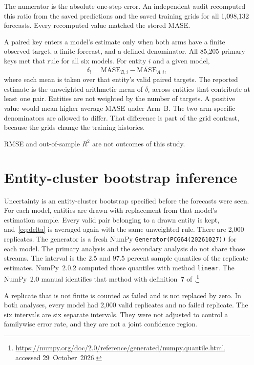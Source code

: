 \documentclass[11pt]{article}
\newcommand{\armB}{Arm~B}
\begin{document}
The numerator is the absolute one-step error. An independent audit recomputed this ratio from the saved predictions and the saved training grids for all 1{,}098{,}132 forecasts. Every recomputed value matched the stored MASE.

A paired key enters a model's estimate only when both arms have a finite observed target, a finite forecast, and a defined denominator. All 85{,}205 primary keys met that rule for all six models. For entity \(i\) and a given model,
\begin{equation}
\delta_i = \overline{\mathrm{MASE}}_{B,i} - \overline{\mathrm{MASE}}_{A,i},
\label{eq:delta}
\end{equation}
where each mean is taken over that entity's valid paired targets. The reported estimate is the unweighted arithmetic mean of \(\delta_i\) across entities that contribute at least one pair. Entities are not weighted by the number of targets. A positive value would mean higher average MASE under \armB{}. The two arm-specific denominators are allowed to differ. That difference is part of the grid contrast, because the grids change the training histories.

RMSE and out-of-sample \(R^{2}\) are not outcomes of this study.

\section{Entity-cluster bootstrap inference}
\label{sec:bootstrap}

Uncertainty is an entity-cluster bootstrap specified before the forecasts were seen. For each model, entities are drawn with replacement from that model's estimation sample. Every valid pair belonging to a drawn entity is kept, and~\eqref{eq:delta} is averaged again with the same unweighted rule. There are 2{,}000 replicates. The generator is a fresh NumPy \texttt{Generator(PCG64(20261027))} for each model. The primary analysis and the secondary analysis do not share those streams. The interval is the 2.5 and 97.5 percent sample quantiles of the replicate estimates. NumPy~2.0.2 computed those quantiles with method \texttt{linear}. The NumPy~2.0 manual identifies that method with definition~7 of \citet{hyndman1996quantiles}.\footnote{\url{https://numpy.org/doc/2.0/reference/generated/numpy.quantile.html}, accessed 29~October~2026.}

A replicate that is not finite is counted as failed and is not replaced by zero. In both analyses, every model had 2{,}000 valid replicates and no failed replicate. The six intervals are six separate intervals. They were not adjusted to control a familywise error rate, and they are not a joint confidence region.
\end{document}
